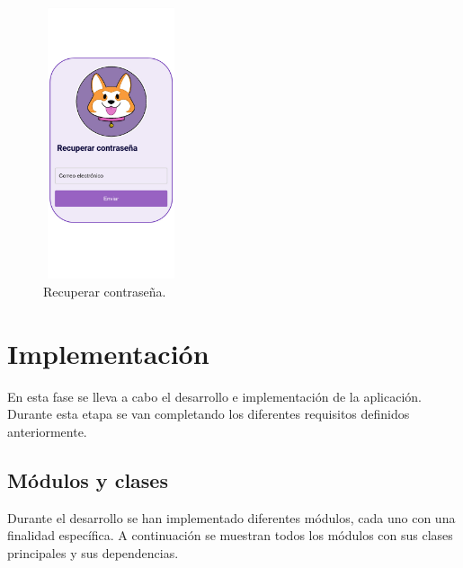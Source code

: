 \documentclass[a4paper, 12pt]{article}
\begin{document}
\begin{figure}[H]
   	\begin{minipage}{0.48\textwidth}
		\begin{center}
			{\includegraphics[height=8cm, width=4cm]{PasswordRecovery.jpg}\par}
			\caption{Recuperar contraseña.}
			\medskip
		\end{center}  
	\end{minipage}\hfill
\end{figure}


\newpage
\section{Implementación}

En esta fase se lleva a cabo el desarrollo e implementación de la aplicación. Durante esta etapa se van completando los diferentes requisitos definidos anteriormente.  

\subsection{Módulos y clases}
Durante el desarrollo se han implementado diferentes módulos, cada uno con una finalidad específica. A continuación se muestran todos los módulos con sus clases principales y sus dependencias.
\end{document}
